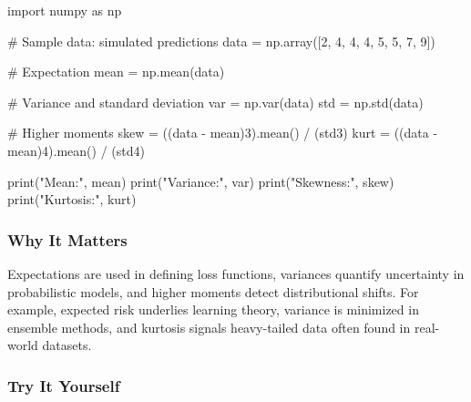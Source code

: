 \documentclass[
  letterpaper,
  DIV=11,
  numbers=noendperiod]{scrreprt}
\newenvironment{Shaded}{\begin{snugshade}}{\end{snugshade}}
\newcommand{\BuiltInTok}[1]{\textcolor[rgb]{0.00,0.23,0.31}{#1}}
\newcommand{\CommentTok}[1]{\textcolor[rgb]{0.37,0.37,0.37}{#1}}
\newcommand{\DecValTok}[1]{\textcolor[rgb]{0.68,0.00,0.00}{#1}}
\newcommand{\ImportTok}[1]{\textcolor[rgb]{0.00,0.46,0.62}{#1}}
\newcommand{\NormalTok}[1]{\textcolor[rgb]{0.00,0.23,0.31}{#1}}
\newcommand{\OperatorTok}[1]{\textcolor[rgb]{0.37,0.37,0.37}{#1}}
\newcommand{\StringTok}[1]{\textcolor[rgb]{0.13,0.47,0.30}{#1}}
\begin{document}
\begin{Shaded}
\begin{Highlighting}[]
\ImportTok{import}\NormalTok{ numpy }\ImportTok{as}\NormalTok{ np}

\CommentTok{\# Sample data: simulated predictions}
\NormalTok{data }\OperatorTok{=}\NormalTok{ np.array([}\DecValTok{2}\NormalTok{, }\DecValTok{4}\NormalTok{, }\DecValTok{4}\NormalTok{, }\DecValTok{4}\NormalTok{, }\DecValTok{5}\NormalTok{, }\DecValTok{5}\NormalTok{, }\DecValTok{7}\NormalTok{, }\DecValTok{9}\NormalTok{])}

\CommentTok{\# Expectation}
\NormalTok{mean }\OperatorTok{=}\NormalTok{ np.mean(data)}

\CommentTok{\# Variance and standard deviation}
\NormalTok{var }\OperatorTok{=}\NormalTok{ np.var(data)}
\NormalTok{std }\OperatorTok{=}\NormalTok{ np.std(data)}

\CommentTok{\# Higher moments}
\NormalTok{skew }\OperatorTok{=}\NormalTok{ ((data }\OperatorTok{{-}}\NormalTok{ mean)}\DecValTok{3}\NormalTok{).mean() }\OperatorTok{/}\NormalTok{ (std3)}
\NormalTok{kurt }\OperatorTok{=}\NormalTok{ ((data }\OperatorTok{{-}}\NormalTok{ mean)}\DecValTok{4}\NormalTok{).mean() }\OperatorTok{/}\NormalTok{ (std4)}

\BuiltInTok{print}\NormalTok{(}\StringTok{"Mean:"}\NormalTok{, mean)}
\BuiltInTok{print}\NormalTok{(}\StringTok{"Variance:"}\NormalTok{, var)}
\BuiltInTok{print}\NormalTok{(}\StringTok{"Skewness:"}\NormalTok{, skew)}
\BuiltInTok{print}\NormalTok{(}\StringTok{"Kurtosis:"}\NormalTok{, kurt)}
\end{Highlighting}
\end{Shaded}

\subsubsection{Why It Matters}\label{why-it-matters-20}

Expectations are used in defining loss functions, variances quantify
uncertainty in probabilistic models, and higher moments detect
distributional shifts. For example, expected risk underlies learning
theory, variance is minimized in ensemble methods, and kurtosis signals
heavy-tailed data often found in real-world datasets.

\subsubsection{Try It Yourself}\label{try-it-yourself-122}
\end{document}
